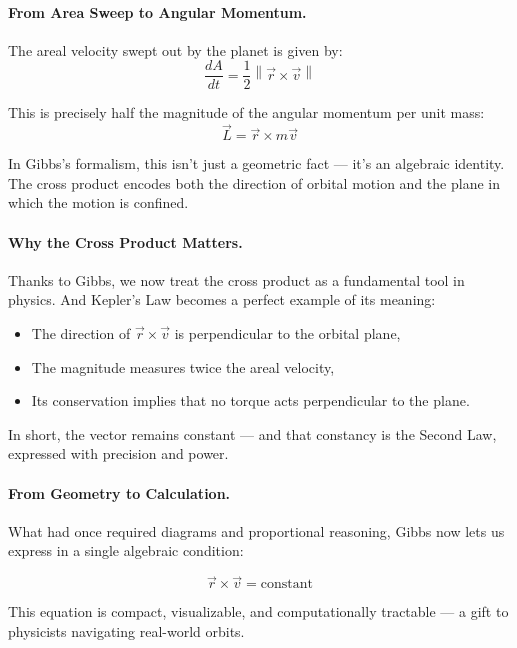 \bigskip

\paragraph{From Area Sweep to Angular Momentum.}

The areal velocity swept out by the planet is given by:
\[
\frac{dA}{dt} = \frac{1}{2} \left\| \vec{r} \times \vec{v} \right\|
\]

This is precisely half the magnitude of the angular momentum per unit mass:
\[
\vec{L} = \vec{r} \times m\vec{v}
\]

In Gibbs’s formalism, this isn’t just a geometric fact — it’s an algebraic identity.  
The cross product encodes both the direction of orbital motion and the plane in which the motion is confined.

\bigskip

\paragraph{Why the Cross Product Matters.}

Thanks to Gibbs, we now treat the cross product as a fundamental tool in physics.  
And Kepler’s Law becomes a perfect example of its meaning:

\begin{itemize}
    \item The direction of \( \vec{r} \times \vec{v} \) is perpendicular to the orbital plane,
    \item The magnitude measures twice the areal velocity,
    \item Its conservation implies that no torque acts perpendicular to the plane.
\end{itemize}

In short, the vector remains constant — and that constancy is the Second Law, expressed with precision and power.

\bigskip

\paragraph{From Geometry to Calculation.}

What had once required diagrams and proportional reasoning,  
Gibbs now lets us express in a single algebraic condition:

\[
\vec{r} \times \vec{v} = \text{constant}
\]

This equation is compact, visualizable, and computationally tractable — a gift to physicists navigating real-world orbits.

